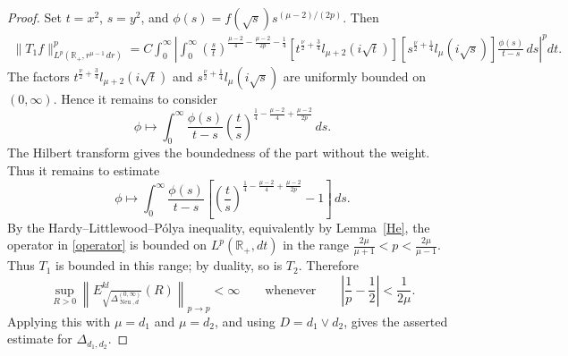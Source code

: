 \documentclass[12pt]{amsart}
\newcommand\Neu{\operatorname{Neu}}
\newcommand\LapoN{\Delta^{(0, \infty)}_{\Neu, d}}
\newcommand\Lapd{\Delta_{d_1, d_2}}
\begin{document}
\begin{proof}
Set $t=x^2$, $s=y^2$, and
\(\phi(s)=f(\sqrt{s})s^{(\mu-2)/(2p)}.
\)
Then
\begin{align*}
\|T_1f\|_{L^p(\mathbb{R}_+,r^{\mu-1}\,dr)}^p
=
C\int_0^\infty
\left|\int_0^\infty
\left(\frac{s}{t}\right)^{
\frac{\mu-2}{4}-\frac{\mu-2}{2p}-\frac14}
\left[t^{\frac{\nu}{2}+\frac34}l_{\mu+2}(i\sqrt t)\right]
\left[s^{\frac{\nu}{2}+\frac14}l_\mu(i\sqrt s)\right]
\frac{\phi(s)}{t-s}\,ds
\right|^p dt .
\end{align*}
The factors
\(t^{\frac{\nu}{2}+\frac34}l_{\mu+2}(i\sqrt t)\) and
    \(s^{\frac{\nu}{2}+\frac14}l_\mu(i\sqrt s)\)
are uniformly bounded on $(0,\infty)$. Hence it remains to consider
\[
    \phi\mapsto
    \int_0^\infty
    \frac{\phi(s)}{t-s}
    \left(\frac{t}{s}\right)^{
    \frac14-\frac{\mu-2}{4}+\frac{\mu-2}{2p}}
    \,ds .
\]
The Hilbert transform gives the boundedness of the part without the
weight. Thus it remains to estimate
\begin{equation}\label{operator}
    \phi\mapsto
    \int_0^\infty
    \frac{\phi(s)}{t-s}
    \left[
    \left(\frac{t}{s}\right)^{
    \frac14-\frac{\mu-2}{4}+\frac{\mu-2}{2p}}
    -1
    \right]\,ds .
\end{equation}
By the Hardy--Littlewood--Pólya inequality, equivalently by
Lemma~\ref{He}, the operator in \eqref{operator} is bounded on
$L^p(\mathbb{R}_+,dt)$ in the range
\(\frac{2\mu}{\mu+1}<p<\frac{2\mu}{\mu-1}.
\)
Thus $T_1$ is bounded in this range; by duality, so is $T_2$. Therefore
\[
    \sup_{R>0}
    \left\|E_{\sqrt{\LapoN}}^{kl}(R)\right\|_{p\to p}
    <\infty
    \qquad
    \text{whenever}
    \qquad
    \left|\frac1p-\frac12\right|<\frac{1}{2\mu}.
\]
Applying this with $\mu=d_1$ and $\mu=d_2$, and using
$D=d_1\vee d_2$, gives the asserted estimate for $\Lapd$.
\end{proof}
\end{document}
